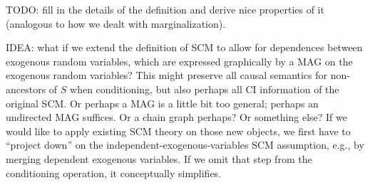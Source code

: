 TODO: fill in the details of the definition and derive nice properties of it (analogous to how we dealt with marginalization).

IDEA: what if we extend the definition of SCM to allow for dependences between exogenous random variables, which are 
expressed graphically by a MAG on the exogenous random variables? This might preserve all causal semantics for non-ancestors
of $S$ when conditioning, but also perhaps all CI information of the original SCM. Or perhaps a MAG is a little bit too
general; perhaps an undirected MAG suffices. Or a chain graph perhaps? Or something else? If we would like to apply 
existing SCM theory on those new objects, we first have to ``project down'' on the independent-exogenous-variables
SCM assumption, e.g., by merging dependent exogenous variables. If we omit that step from the conditioning operation,
it conceptually simplifies.
